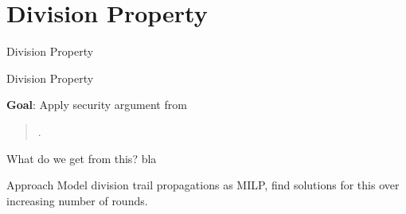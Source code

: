 \section{Division Property}
\begin{frame}
    \centering
    \Huge
    Division Property
    \vfill
\end{frame}
\begin{frame}{Division Property}
    \begin{block}{\textbf{Goal}: Apply security argument from}
    \begin{quote}
        .
    \end{quote}
    \end{block}
    \begin{exampleblock}{What do we get from this?}
        \centering
        bla
    \end{exampleblock}
    \begin{block}{Approach}
        \centering
        Model division trail propagations as MILP, find solutions for this over increasing number of rounds.
    \end{block}
\end{frame}

